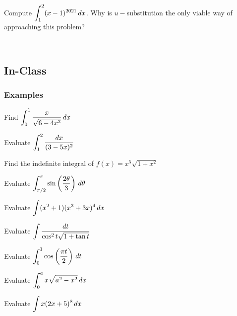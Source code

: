 \documentclass[notes]{subfiles}
\begin{document}
		\begin{ex}
			Compute $\displaystyle \int_1^2 (x-1)^{2021}\, dx$.  Why is $u-$substitution the only viable way of approaching this problem?
		\end{ex}
			\\ 
			\newsec $ $
			
	\subsection*{In-Class}
	\subsubsection*{Examples}
		\begin{ex}
			Find $\displaystyle \int_0^1 \dfrac{x}{\sqrt{6-4x^2}}\,dx$
		\end{ex}
			
		\begin{ex}
			Evaluate $\displaystyle \int_1^2 \dfrac{dx}{(3-5x)^2}$
		\end{ex}
			\newpage 

		\begin{ex}
			Find the indefinite integral of $f(x) = x^5\sqrt{1+x^2}$
		\end{ex}
			
		\begin{ex}
			Evaluate $\displaystyle \int_{\pi/2}^\pi \sin\left( \dfrac{2\theta}{3}\right)\,d\theta$
		\end{ex}
			\newpage
			
		\begin{ex}
			Evaluate $\displaystyle \int (x^2+1)(x^3+3x)^4\,dx$
		\end{ex}
			
		\begin{ex}
			Evaluate $\displaystyle \int \dfrac{dt}{\cos^2t\sqrt{1+\tan t}}$
		\end{ex}
			
		\begin{ex}
			Evaluate $\displaystyle \int_0^1\cos\left( \dfrac{\pi t}{2}\right)\, dt$
		\end{ex}
			\newpage
			
		\begin{ex}
			Evaluate $\displaystyle \int_0^a x\sqrt{a^2-x^2}\,dx$
		\end{ex}
			
		\begin{ex}
			Evaluate $\displaystyle \int x(2x+5)^8\,dx$
		\end{ex}	
			
\end{document}
